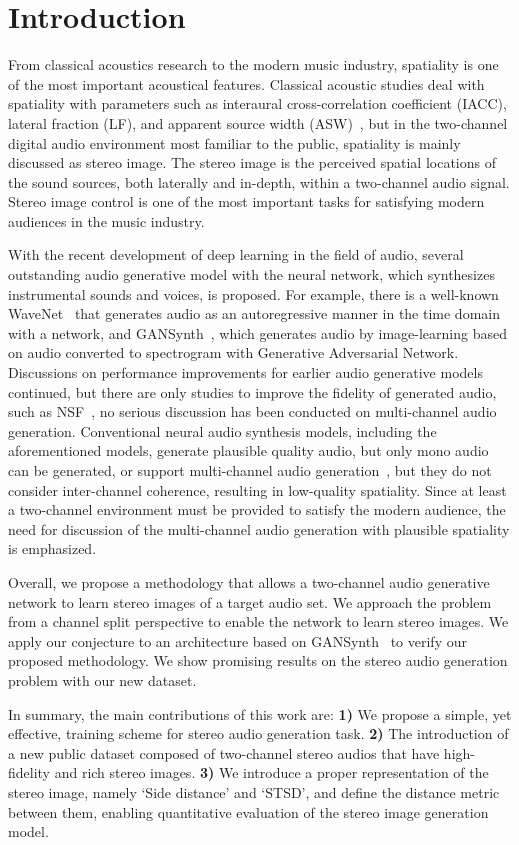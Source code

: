 \section{Introduction}
\label{sec:intro}
From classical acoustics research to the modern music industry, spatiality is one of the most important acoustical features. Classical acoustic studies deal with spatiality with parameters such as interaural cross-correlation coefficient (IACC), lateral fraction (LF), and apparent source width (ASW)~\cite{classic}, but in the two-channel digital audio environment most familiar to the public, spatiality is mainly discussed as stereo image. The stereo image is the perceived spatial locations of the sound sources, both laterally and in-depth, within a two-channel audio signal. Stereo image control is one of the most important tasks for satisfying modern audiences in the music industry.

With the recent development of deep learning in the field of audio, several outstanding audio generative model with the neural network, which synthesizes instrumental sounds and voices, is proposed. For example, there is a well-known WaveNet~\cite{wavenet} that generates audio as an autoregressive manner in the time domain with a network, and GANSynth~\cite{gansynth}, which generates audio by image-learning based on audio converted to spectrogram with Generative Adversarial Network. Discussions on performance improvements for earlier audio generative models continued, but there are only studies to improve the fidelity of generated audio, such as NSF~\cite{nsf}, no serious discussion has been conducted on multi-channel audio generation. Conventional neural audio synthesis models, including the aforementioned models, generate plausible quality audio, but only mono audio can be generated, or support multi-channel audio generation~\cite{wavegan}, but they do not consider inter-channel coherence, resulting in low-quality spatiality. Since at least a two-channel environment must be provided to satisfy the modern audience, the need for discussion of the multi-channel audio generation with plausible spatiality is emphasized.

Overall, we propose a methodology that allows a two-channel audio generative network to learn stereo images of a target audio set. We approach the problem from a channel split perspective to enable the network to learn stereo images. We apply our conjecture to an architecture based on GANSynth~\cite{gansynth} to verify our proposed methodology. We show promising results on the stereo audio generation problem with our new dataset.

In summary, the main contributions of this work are: \textbf{1)} We propose a simple, yet effective, training scheme for stereo audio generation task. \textbf{2)} The introduction of a new public dataset composed of two-channel stereo audios that have high-fidelity and rich stereo images. \textbf{3)} We introduce a proper representation of the stereo image, namely `Side distance' and `STSD', and define the distance metric between them, enabling quantitative evaluation of the stereo image generation model.